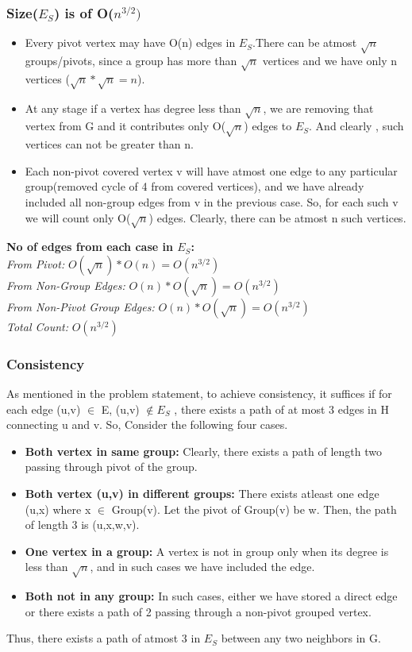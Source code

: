 \documentclass{article}
\begin{document}
\subsubsection{Size($E_S$) is of O($n^{3/2})$}
\begin{itemize}
\item Every pivot vertex may have O(n) edges in $E_S$.There can be atmost $\sqrt{n}$ groups/pivots, since a group has more than $\sqrt{n}$ vertices and we have only n vertices ($\sqrt{n}*\sqrt{n} = n $).
\item At any stage if a vertex has degree less than $\sqrt{n}$, we are removing that vertex from G and it contributes only O($\sqrt{n}$) edges to $E_S$. And clearly , such vertices can not be greater than n.
\item Each non-pivot covered vertex v will have atmost one edge to any particular group(removed cycle of 4 from covered vertices), and we have already included all non-group edges from v in the previous case. So, for each such v we will count only O($\sqrt{n}$) edges. Clearly, there can be atmost n such vertices.
\end{itemize}
\textbf{No of edges from each case in $E_S$: }\\
\emph{From Pivot: } $O(\sqrt{n}) * O(n) = O(n^{3/2})$\\ 
\emph{From Non-Group Edges: }$ O(n) * O(\sqrt{n}) = O(n^{3/2})$\\ 
\emph{From Non-Pivot Group Edges: }$ O(n) * O(\sqrt{n}) = O(n^{3/2})$\\ 
\emph{Total Count: } $O(n^{3/2})$

\subsubsection{Consistency}
As mentioned in the problem statement, to achieve consistency, it suffices if for each edge (u,v) $\in$ E, (u,v) $\notin E_S$  , there exists a path of at most 3 edges in H connecting u and v. So, Consider the following four cases.

\begin{itemize}
\item \textbf{Both vertex in same group: }Clearly, there exists a path of length two passing through pivot of the group.
\item \textbf{Both vertex (u,v) in different groups: } There exists atleast one edge (u,x) where x $\in$ Group(v). Let the pivot of Group(v) be w. Then, the path of length 3 is (u,x,w,v).
\item \textbf{One vertex in a group: } A vertex is not in group only when its degree is less than $\sqrt{n}$, and in such cases we have included the edge.
\item \textbf{Both not in any group: }In such cases, either we have stored a direct edge or there exists a path of 2 passing through a non-pivot grouped vertex.
\end{itemize}
Thus, there exists a path of atmost 3 in $E_S$ between any two neighbors in G.
\end{document}
